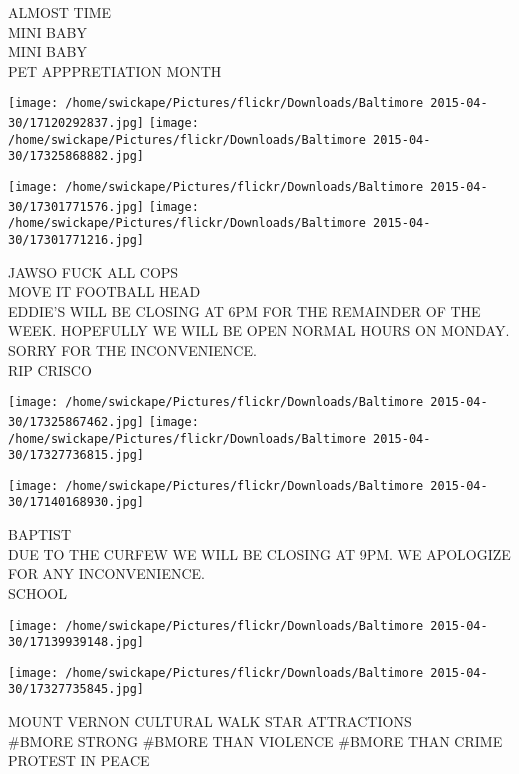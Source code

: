 \documentclass[10pt,letterpaper]{article}
\begin{document}
ALMOST TIME\\
MINI BABY\\
MINI BABY\\
PET APPPRETIATION MONTH
\pagebreak

\texttt{[image: /home/swickape/Pictures/flickr/Downloads/Baltimore 2015-04-30/17120292837.jpg]}
\texttt{[image: /home/swickape/Pictures/flickr/Downloads/Baltimore 2015-04-30/17325868882.jpg]}

\texttt{[image: /home/swickape/Pictures/flickr/Downloads/Baltimore 2015-04-30/17301771576.jpg]}
\texttt{[image: /home/swickape/Pictures/flickr/Downloads/Baltimore 2015-04-30/17301771216.jpg]}

JAWSO FUCK ALL COPS\\
MOVE IT FOOTBALL HEAD\\
EDDIE'S WILL BE CLOSING AT 6PM FOR THE REMAINDER OF THE WEEK.  HOPEFULLY WE WILL BE OPEN NORMAL HOURS ON MONDAY.  SORRY FOR THE INCONVENIENCE.\\
RIP CRISCO
\pagebreak

\texttt{[image: /home/swickape/Pictures/flickr/Downloads/Baltimore 2015-04-30/17325867462.jpg]}
\texttt{[image: /home/swickape/Pictures/flickr/Downloads/Baltimore 2015-04-30/17327736815.jpg]}

\texttt{[image: /home/swickape/Pictures/flickr/Downloads/Baltimore 2015-04-30/17140168930.jpg]}

BAPTIST\\
DUE TO THE CURFEW WE WILL BE CLOSING AT 9PM.  WE APOLOGIZE FOR ANY INCONVENIENCE.\\
SCHOOL
\pagebreak

\texttt{[image: /home/swickape/Pictures/flickr/Downloads/Baltimore 2015-04-30/17139939148.jpg]}

\vspace{0.25in}
\texttt{[image: /home/swickape/Pictures/flickr/Downloads/Baltimore 2015-04-30/17327735845.jpg]}

MOUNT VERNON CULTURAL WALK STAR ATTRACTIONS\\
\#BMORE STRONG \#BMORE THAN VIOLENCE \#BMORE THAN CRIME PROTEST IN PEACE
\pagebreak
\end{document}
